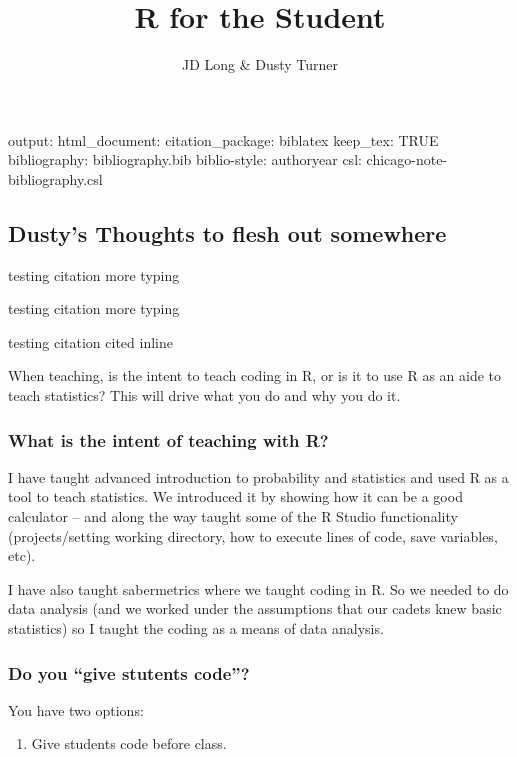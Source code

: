 \documentclass[]{article}
\title{R for the Student}
\author{JD Long \& Dusty Turner}
\date{}
\providecommand{\tightlist}{%
  \setlength{\itemsep}{0pt}\setlength{\parskip}{0pt}}
\begin{document}
\maketitle

output: html\_document: citation\_package: biblatex keep\_tex: TRUE
bibliography: bibliography.bib biblio-style: authoryear csl:
chicago-note-bibliography.csl

\subsection{Dusty's Thoughts to flesh out
somewhere}\label{dustys-thoughts-to-flesh-out-somewhere}

testing citation \autocite*{R-knitr} more typing

testing citation \autocite*{R-rmarkdown} more typing

testing citation \textcite{R-rmarkdown} cited inline

When teaching, is the intent to teach coding in R, or is it to use R as
an aide to teach statistics? This will drive what you do and why you do
it.

\subsubsection{What is the intent of teaching with
R?}\label{what-is-the-intent-of-teaching-with-r}

I have taught advanced introduction to probability and statistics and
used R as a tool to teach statistics. We introduced it by showing how it
can be a good calculator -- and along the way taught some of the R
Studio functionality (projects/setting working directory, how to execute
lines of code, save variables, etc).

I have also taught sabermetrics where we taught coding in R. So we
needed to do data analysis (and we worked under the assumptions that our
cadets knew basic statistics) so I taught the coding as a means of data
analysis.

\subsubsection{\texorpdfstring{Do you ``give stutents
code''?}{Do you give stutents code?}}\label{do-you-give-stutents-code}

You have two options:

\begin{enumerate}
\def\labelenumi{\arabic{enumi})}
\tightlist
\item
  Give students code before class.
\end{enumerate}
\end{document}
